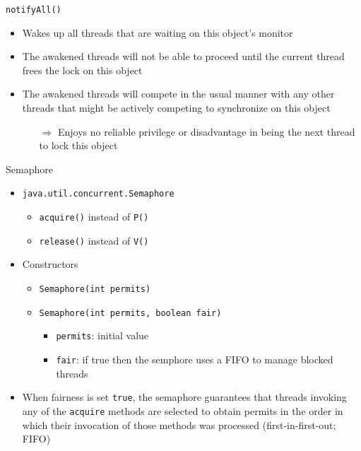 \begin{frame}[fragile]{\lstinline!notifyAll()!}
  \begin{itemize}
  \item Wakes up all threads that are waiting on this object's
    monitor
  \item The awakened threads will not be able to proceed until the
    current thread frees the lock on this object
  \item The awakened threads will compete in the usual manner with any
    other threads that might be actively competing to synchronize on
    this object
    \begin{itemize}
    \item[$\Rightarrow$] Enjoys no reliable privilege or disadvantage
      in being the next thread to lock this object
    \end{itemize}
  \end{itemize}
\end{frame}

\begin{frame}[fragile]{Semaphore}
  \begin{itemize}
  \item \lstinline!java.util.concurrent.Semaphore!
    \begin{itemize}
    \item \lstinline!acquire()! instead of \lstinline!P()!
    \item \lstinline!release()! instead of \lstinline!V()!
    \end{itemize}
  \item Constructors
    \begin{itemize}
    \item \lstinline!Semaphore(int permits)!
    \item \lstinline!Semaphore(int permits, boolean fair)!
      \begin{itemize}
      \item \lstinline!permits!: initial value
      \item \lstinline!fair!: if true then the semphore uses a FIFO to
        manage blocked threads
      \end{itemize}
    \end{itemize}
  \item When fairness is set \lstinline!true!, the semaphore
    guarantees that threads invoking any of the \lstinline!acquire!
    methods are selected to obtain permits in the order in which their
    invocation of those methods was processed (first-in-first-out;
    FIFO)
  \end{itemize}
\end{frame}

